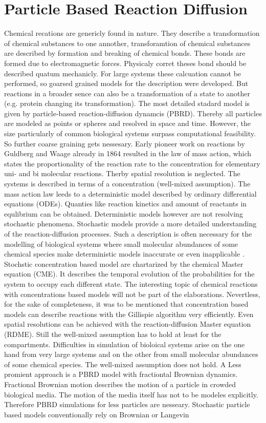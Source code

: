 \documentclass[
  a4paper,BCOR10mm,oneside,
  bibtotoc,idxtotoc,
  headsepline,footsepline,%
  fleqn,openbib
]{scrbook}
\begin{document}
\chapter{Particle Based Reaction Diffusion }
Chemical recations are genericly found in nature. They describe a transformation of chemical substances to one annother, transforamtion of chemical substances are described by formation and breaking of chemical bonds. These bonds are formed due to electromagnetic forces. Physicaly corret theses bond should be described quatum mechanicly. For large systems these calcuation cannot be performed, so goarsed grained models for the description were developed. But reactions in a broader sence can also be a transformation of a state to another (e.g. protein changing its transformation). The most detailed stadard model is given by particle-based reaction-diffusion dynamcis (PBRD). Thereby all particles are modeled as points or spheres and resolved in space and time. However, the size particularly of common biological systems surpass computational feasibility. So further coarse graining gets nessesary. Early pioneer work on reactions by Guldberg and Waage already in 1864 \cite{Waage1986} resulted in the law of mass action, which states the proportionality of the reaction rate to the concentration for elementary uni- and bi molecular reactions. Therby spatial resolution is neglected. The systems is described in terms of a concentration (well-mixed assumption). The mass action law leeds to a deterministic model described by ordinary differential equations (ODEs). Quanties like reaction kinetics and amount of reactants in equlibrium can be obtained. Deterministic models however are not resolving stochastic phenomena. Stochastic models provide a more detailed understanding of the reaction-diffusion processes. Such a description is often necessary for the modelling of biological systems where small molecular abundances of some chemical species make deterministic models inaccurate or even inapplicable \cite{0704.1908}. Stochstic concentration based model are chartarized by the chemical Master equation (CME). It describes the temporal evolution of the probabilities for the system to occupy each different state. The interesting topic of chemical reactions with concentrations based models will not be part of the elaborations. Nevertless, for the sake of completeness, it was to be mentioned that concentration based models can describe reactions with the Gillispie algorithm \cite{Gillespie1977} very efficiently. Even spatial resolutions can be achieved with the reaction-diffusion Master equation (RDME). Still the well-mixed assumption has to hold at least for the compartments. Difficulties in simulation of bioloical systems arise on the one hand from very large systems and on the other from small molecular abundances of some chemical species. The well-mixed assumption does not hold. A Less promient approach is a PBRD model with fractiontal Brownian dynamics. Fractional Brownian motion describes the motion of a particle in crowded biological media. The motion of the media itself has not to be modeles explicitly. Therefore PBRD simulations for less particles are nesseary. Stochastic particle based models conventionally rely on Brownian or Langevin 
\end{document}
